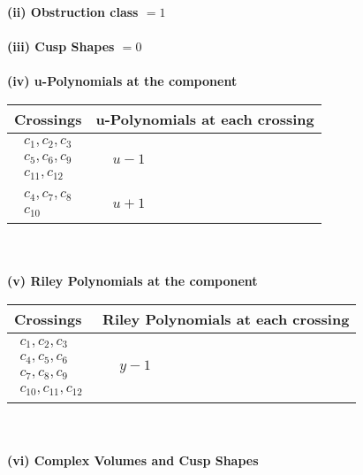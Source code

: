 \documentclass[1p]{elsarticle_modified}
\theoremstyle{definition}
\begin{document}
\flushleft \textbf{(ii) Obstruction class $= 1$}\\~\\
\flushleft \textbf{(iii) Cusp Shapes $= 0$}\\~\\
\newpage\renewcommand{\arraystretch}{1}
\flushleft \textbf{(iv) u-Polynomials at the component}\newline \\
\begin{tabular}{m{50pt}|m{274pt}}
Crossings & \hspace{64pt}u-Polynomials at each crossing \\
\hline $$\begin{aligned}c_{1},c_{2},c_{3}\\c_{5},c_{6},c_{9}\\c_{11},c_{12}\end{aligned}$$&$\begin{aligned}
&u-1
\end{aligned}$\\
\hline $$\begin{aligned}c_{4},c_{7},c_{8}\\c_{10}\end{aligned}$$&$\begin{aligned}
&u+1
\end{aligned}$\\
\hline
\end{tabular}\\~\\
\newpage\renewcommand{\arraystretch}{1}
\flushleft \textbf{(v) Riley Polynomials at the component}\newline \\
\begin{tabular}{m{50pt}|m{274pt}}
Crossings & \hspace{64pt}Riley Polynomials at each crossing \\
\hline $$\begin{aligned}c_{1},c_{2},c_{3}\\c_{4},c_{5},c_{6}\\c_{7},c_{8},c_{9}\\c_{10},c_{11},c_{12}\end{aligned}$$&$\begin{aligned}
&y-1
\end{aligned}$\\
\hline
\end{tabular}\\~\\
\newpage\flushleft \textbf{(vi) Complex Volumes and Cusp Shapes}
\end{document}
